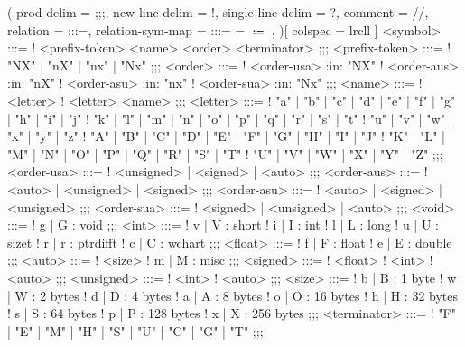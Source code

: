 \def\nxGram#1{\nxSpec{grammer/#1}}

\begin{center}
	\begin{bnf}(
	prod-delim = ;;;,
	new-line-delim = !,
	single-line-delim = ?,
	comment = //,
	relation = {:::=},
	relation-sym-map = { {:::=} = $\Coloneqq$ },
)[
	colspec = lrcll
]
		<symbol> :::=
			! <prefix-token> <name> <order> <terminator>
		;;;
		<prefix-token> :::=
			! "NX" | "nX" | "nx" | "Nx"
		;;;
		<order> :::=
			! <order-usa> :in: "NX"
			! <order-aus> :in: "nX"
			! <order-asu> :in: "nx"
			! <order-sua> :in: "Nx"
		;;;
		<name> :::=
			! <letter>
			! <letter> <name>
		;;;
		<letter> :::=
			! "a" | "b" | "c" | "d" | "e" | "f" | "g" | "h" | "i" | "j"
			! "k" | "l" | "m" | "n" | "o" | "p" | "q" | "r" | "s" | "t"
			! "u" | "v" | "w" | "x" | "y" | "z"
			! "A" | "B" | "C" | "D" | "E" | "F" | "G" | "H" | "I" | "J"
			! "K" | "L" | "M" | "N" | "O" | "P" | "Q" | "R" | "S" | "T"
			! "U" | "V" | "W" | "X" | "Y" | "Z"
		;;;
		<order-usa> :::=
			! <unsigned> | <signed> | <auto>
		;;;
		<order-aus> :::=
			! <auto> | <unsigned> | <signed>
		;;;
		<order-asu> :::=
			! <auto> | <signed> | <unsigned>
		;;;
		<order-sua> :::=
			! <signed> | <unsigned> | <auto>
		;;;
		<void> :::=
			! g | G : void
		;;;
		<int> :::=
			! v | V : short
			! i | I : int
			! l | L : long
			! u | U : sizet
			! r | r : ptrdifft
			! c | C : wchart
		;;;
		<float> :::=
			! f | F : float
			! e | E : double
		;;;
		<auto> :::=
			! <size>
			! m | M : misc
		;;;
		<signed> :::=
			! <float>
			! <int>
			! <auto>
		;;;
		<unsigned> :::=
			! <int>
			! <auto>
		;;;
		<size> :::=
			! b | B : 1 byte
			! w | W : 2 bytes
			! d | D : 4 bytes
			! a | A : 8 bytes
			! o | O : 16 bytes
			! h | H : 32 bytes
			! s | S : 64 bytes
			! p | P : 128 bytes
			! x | X : 256 bytes
		;;;
		<terminator> :::=
			! "F" | "E" | "M" | "H" | "S" | "U" | "C" | "G" | "T"
		;;;
	\end{bnf}
\end{center}

\nxGram{prefix}
\nxGram{grouping}

